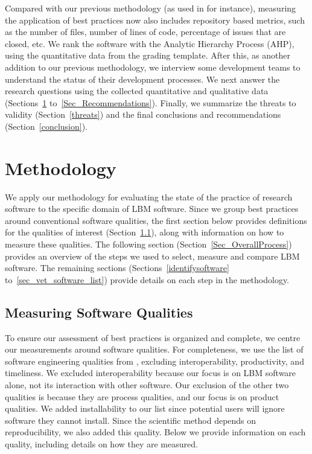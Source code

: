 \documentclass[final, 3p, times, authoryear]{elsarticle}
\begin{document}
Compared with our previous methodology (as used in \citet{SmithEtAl2016} for
instance), measuring the application of best practices now also includes
repository based metrics, such as the number of files, number of lines of code,
percentage of issues that are closed, etc.  We rank the software with the
Analytic Hierarchy Process (AHP), using the quantitative data from the grading
template. After this, as another addition to our previous methodology, we
interview some development teams to understand the status of their
development processes. We next answer the research questions using the collected
quantitative and qualitative data (Sections~\ref{methodology}
to~\ref{Sec_Recommendations}).  Finally, we summarize the threats to validity
(Section~\ref{threats}) and the final conclusions and recommendations
(Section~\ref{conclusion}).

\section{Methodology} \label{methodology}

We apply our methodology for evaluating the state of the practice of research
software \citep{SmithEtAl2021, SmithAndMichalski2022} to the specific domain of
LBM software.  Since we group best practices around conventional software
qualities, the first section below provides definitions for the qualities of
interest (Section~\ref{softwarequalities}), along with information on how to
measure these qualities. The following section
(Section~\ref{Sec_OverallProcess}) provides an overview of the steps we used to
select, measure and compare LBM software.  The remaining sections
(Sections~\ref{identifysoftware} to~\ref{sec_vet_software_list}) provide details
on each step in the methodology. 

\subsection{Measuring Software Qualities} \label{softwarequalities}

To ensure our assessment of best practices is organized and complete, we centre
our measurements around software qualities. For completeness, we use the list of
software engineering qualities from \citet[p.\ 17--33]{GhezziEtAl2003},
excluding interoperability, productivity, and timeliness. We excluded
interoperability because our focus is on LBM software alone, not its interaction
with other software. Our exclusion of the other two qualities is because they
are process qualities, and our focus is on product qualities. We added
installability to our list since potential users will ignore software they
cannot install.  Since the scientific method depends on reproducibility, we also
added this quality. Below we provide information on each quality, including
details on how they are measured. 
\end{document}
